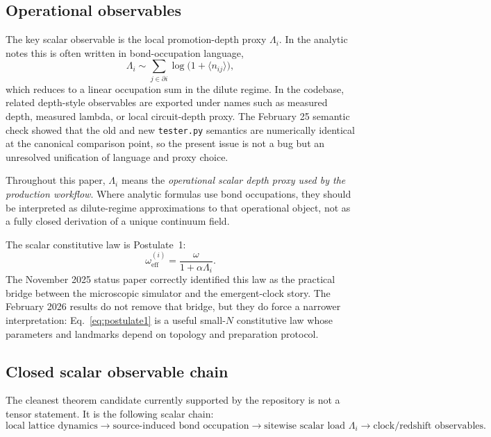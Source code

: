 \documentclass[11pt]{article}
\begin{document}
\subsection{Operational observables}

The key scalar observable is the local promotion-depth proxy $\Lambda_i$. In the analytic notes this is often written in bond-occupation language,
\begin{equation}
\Lambda_i \sim \sum_{j\in \partial i}\log\!\bigl(1+\langle n_{ij}\rangle\bigr),
\label{eq:Lambda-bond}
\end{equation}
which reduces to a linear occupation sum in the dilute regime. In the codebase, related depth-style observables are exported under names such as measured depth, measured lambda, or local circuit-depth proxy. The February 25 semantic check showed that the old and new \texttt{tester.py} semantics are numerically identical at the canonical comparison point, so the present issue is not a bug but an unresolved unification of language and proxy choice.

Throughout this paper, $\Lambda_i$ means the \emph{operational scalar depth proxy used by the production workflow}. Where analytic formulas use bond occupations, they should be interpreted as dilute-regime approximations to that operational object, not as a fully closed derivation of a unique continuum field.

The scalar constitutive law is Postulate~1:
\begin{equation}
\omega_{\mathrm{eff}}^{(i)}
=
\frac{\omega}{1+\alpha \Lambda_i}.
\label{eq:postulate1}
\end{equation}
The November 2025 status paper correctly identified this law as the practical bridge between the microscopic simulator and the emergent-clock story. The February 2026 results do not remove that bridge, but they do force a narrower interpretation: Eq.~\eqref{eq:postulate1} is a useful small-$N$ constitutive law whose parameters and landmarks depend on topology and preparation protocol.

\subsection{Closed scalar observable chain}

The cleanest theorem candidate currently supported by the repository is not a tensor statement. It is the following scalar chain:
\begin{equation}
\text{local lattice dynamics}
\rightarrow
\text{source-induced bond occupation}
\rightarrow
\text{sitewise scalar load }\Lambda_i
\rightarrow
\text{clock/redshift observables}.
\label{eq:scalar-chain}
\end{equation}
\end{document}
